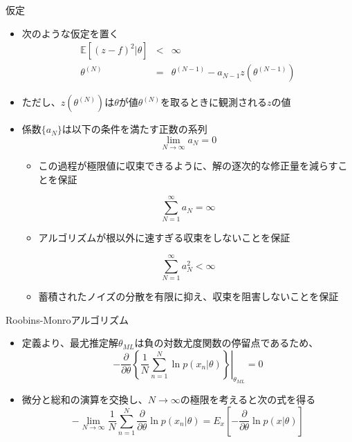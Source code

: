 \begin{frame}{仮定}
 \begin{itemize}
  \item 次のような仮定を置く
        \begin{eqnarray}
         \mathbb{E}[(z-f)^2|\theta] &<& \infty\\
         \theta^{(N)}&=& \theta^{(N-1)}-a_{N-1}z(\theta^{(N-1)})
        \end{eqnarray}
  \item ただし、$z(\theta^{(N)})$は$\theta$が値$\theta^{(N)}$を取るときに観測される$z$の値
  \item 係数$\{a_N\}$は以下の条件を満たす正数の系列
        \begin{equation}
         \lim_{N \rightarrow \infty}a_N=0
        \end{equation}
        \begin{itemize}
         \item この過程が極限値に収束できるように、解の逐次的な修正量を減らすことを保証
        \end{itemize}
        \begin{equation}
         \sum_{N=1}^{\infty}a_N=\infty
        \end{equation}
        \begin{itemize}
         \item アルゴリズムが根以外に速すぎる収束をしないことを保証
        \end{itemize}
        \begin{equation}
         \sum_{N=1}^{\infty}a_N^2 < \infty
        \end{equation}
        \begin{itemize}
         \item 蓄積されたノイズの分散を有限に抑え、収束を阻害しないことを保証
        \end{itemize}
 \end{itemize}
\end{frame}

\begin{frame}{Roobins-Monroアルゴリズム}
 \begin{itemize}
  \item 定義より、最尤推定解$\theta_{ML}$は負の対数尤度関数の停留点であるため、
        \begin{equation}
         -\frac{\partial }{\partial \theta}\left\{\left.\frac{1}{N}\sum_{n=1}^{N}\ln  p(x_n|\theta)\right\}\right|_{\theta_{ML}} = 0
        \end{equation}
  \item 微分と総和の演算を交換し、$N\rightarrow\infty$の極限を考えると次の式を得る
        \begin{equation}
         -\lim_{N \rightarrow \infty}\frac{1}{N}\sum_{n=1}^{N}\frac{\partial}{\partial \theta}\ln p(x_n|\theta)=E_x\left[-\frac{\partial}{\partial \theta}\ln p(x|\theta)\right]
        \end{equation}
 \end{itemize}
\end{frame}

